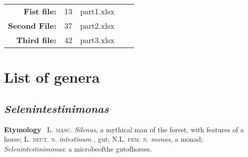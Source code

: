 
\newcommand{\obenlinks}{GAN (the Great Automatic Nomenclator)}   

   


 

\begin{center} 
  \begin{tabular}{|rlp{4cm}rl|}
  \hline
   \textbf{Fist file:}   & 13 &  part1.xlsx & & \\
   \textbf{Second File:} & 37 &  part2.xlsx & & \\
   \textbf{Third file:}  & 42 &  part3.xlsx & & \\ \hline
\end{tabular}
\end{center} 

\section*{List of genera}

\subsection*{\textit{Selenintestinimonas}}
 
\textbf{Etymology} \
\textsc{L. masc.} 
\textit{Silenus}, a mythical man of the forest, with features of a horse; 
\textsc{L. neut. n.}
\textit{intestinum} , gut; 
\textsc{N.L. fem. n.} \textit{monas}, a monad;
\textit{Selenintestinimonas}: a microbeofthe gutofhorses.


